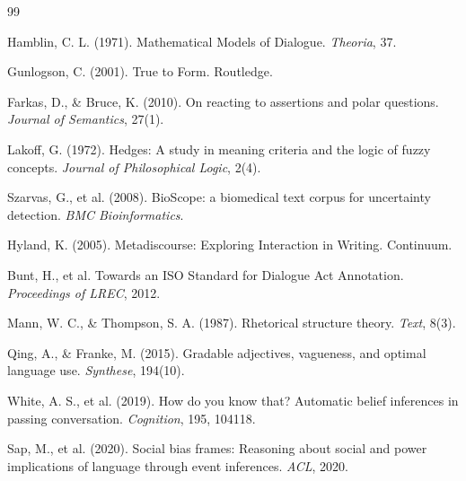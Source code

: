 \documentclass[11pt,letterpaper]{article}
\begin{document}
\begin{thebibliography}{99}

 Hamblin, C. L. (1971). Mathematical Models of Dialogue. \textit{Theoria}, 37.

 Gunlogson, C. (2001). True to Form. Routledge.

 Farkas, D., \& Bruce, K. (2010). On reacting to assertions and polar questions. \textit{Journal of Semantics}, 27(1).

 Lakoff, G. (1972). Hedges: A study in meaning criteria and the logic of fuzzy concepts. \textit{Journal of Philosophical Logic}, 2(4).

 Szarvas, G., et al. (2008). BioScope: a biomedical text corpus for uncertainty detection. \textit{BMC Bioinformatics}.

 Hyland, K. (2005). Metadiscourse: Exploring Interaction in Writing. Continuum.

 Bunt, H., et al. Towards an ISO Standard for Dialogue Act Annotation. \textit{Proceedings of LREC}, 2012.

 Mann, W. C., \& Thompson, S. A. (1987). Rhetorical structure theory. \textit{Text}, 8(3).

 Qing, A., \& Franke, M. (2015). Gradable adjectives, vagueness, and optimal language use. \textit{Synthese}, 194(10).

 White, A. S., et al. (2019). How do you know that? Automatic belief inferences in passing conversation. \textit{Cognition}, 195, 104118.

 Sap, M., et al. (2020). Social bias frames: Reasoning about social and power implications of language through event inferences. \textit{ACL}, 2020.

\end{thebibliography}
\end{document}
